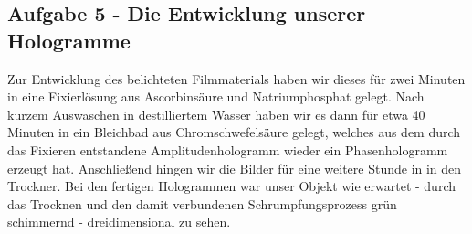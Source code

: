 \subsection*{Aufgabe 5 - Die Entwicklung unserer Hologramme}
Zur Entwicklung des belichteten Filmmaterials haben wir dieses für zwei Minuten in eine Fixierlösung aus Ascorbinsäure und Natriumphosphat gelegt. Nach kurzem Auswaschen in destilliertem Wasser haben wir es dann für etwa 40 Minuten in ein Bleichbad aus Chromschwefelsäure gelegt, welches aus dem durch das Fixieren entstandene Amplitudenhologramm wieder ein Phasenhologramm erzeugt hat. Anschließend hingen wir die Bilder für eine weitere Stunde in in den Trockner. Bei den fertigen Hologrammen war unser Objekt wie erwartet - durch das Trocknen und den damit verbundenen Schrumpfungsprozess grün schimmernd - dreidimensional zu sehen.